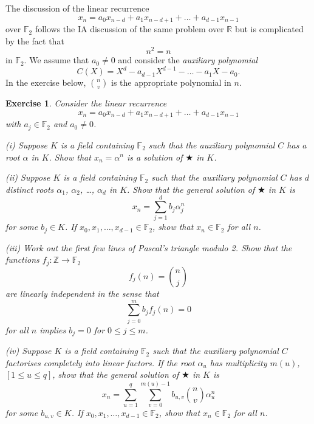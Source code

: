 \documentclass[12pt,a4paper]{article}
\theoremstyle{plain}
\newtheorem{exercise}[theorem]{Exercise}
\theoremstyle{definition}
\begin{document}
The discussion of the linear recurrence
\[x_{n}=a_{0}x_{n-d}+a_{1}x_{n-d+1}+\dots+a_{d-1}x_{n-1}\]
over ${\mathbb F}_{2}$ follows the IA discussion
of the same problem over ${\mathbb R}$ but
is complicated by the fact that
\[n^{2}=n\]
in ${\mathbb F}_{2}$. We assume that $a_{0}\neq 0$
and consider the \emph{auxiliary polynomial}
\[C(X)=X^{d}-a_{d-1}X^{d-1}-\dots-a_{1}X-a_{0}.\]
In the exercise below, ${\displaystyle \binom{n}{v}}$
is the appropriate polynomial in $n$.
\begin{exercise}\label{Solve recurrence}
Consider the linear recurrence
\begin{equation*}
x_{n}=a_{0}x_{n-d}+a_{1}x_{n-d+1}+\ldots+a_{d-1}x_{n-1}\tag*{$\bigstar$}
\end{equation*}
with $a_{j}\in {\mathbb F}_{2}$ and $a_{0}\neq 0$.

(i) Suppose $K$ is a field containing ${\mathbb F}_{2}$
such that the auxiliary polynomial $C$ has a root $\alpha$
in $K$. Show that $x_{n}=\alpha^{n}$ is a solution of $\bigstar$ in $K$.

(ii) Suppose $K$ is a field containing ${\mathbb F}_{2}$
such that the auxiliary polynomial $C$ has
$d$ distinct roots $\alpha_{1}$, $\alpha_{2}$,
\dots, $\alpha_{d}$ in $K$. Show that the general solution
of $\bigstar$ in $K$ is
\[x_{n}=\sum_{j=1}^{d}b_{j}\alpha_{j}^{n}\]
for some $b_{j}\in K$.
If $x_{0},x_{1},\dots,x_{d-1}\in {\mathbb F}_{2}$,
show that $x_{n}\in {\mathbb F}_{2}$ for all $n$.

(iii) Work out the first few lines of Pascal's triangle
modulo 2. Show that the functions
$f_{j}:{\mathbb Z}\rightarrow{\mathbb F}_{2}$
\[f_{j}(n)=\binom{n}{j}\]
are linearly independent in the sense that
\[\sum_{j=0}^{m}b_{j}f_{j}(n)=0\]
for all $n$ implies $b_{j}=0$ for $0\leq j\leq m$.

(iv) Suppose $K$ is a field containing ${\mathbb F}_{2}$
such that the auxiliary polynomial $C$ factorises
completely into linear factors. If the
root $\alpha_{u}$ has multiplicity $m(u)$, $[1\leq u\leq q]$,
show that the general solution
of $\bigstar$ in $K$ is
\[x_{n}=\sum_{u=1}^{q}\sum_{v=0}^{m(u)-1}
b_{u,v}\binom{n}{v}\alpha_{u}^{n}\]
for some $b_{u,v}\in K$.
If $x_{0},x_{1},\dots,x_{d-1}\in {\mathbb F}_{2}$,
show that $x_{n}\in {\mathbb F}_{2}$ for all $n$.
\end{exercise}
\end{document}

